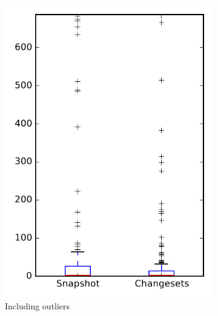 
\begin{figure}
    \centering
    \begin{subfigure}{.4\textwidth}
        \centering
        \includegraphics[height=0.4\textheight]{figures/flt/rq1_bookkeeper}
        \caption{Including outliers}\label{fig:flt:rq1:bookkeeper_outlier}
    \end{subfigure}%
    \begin{subfigure}{.4\textwidth}
        \centering

\end{subfigure}
\end{figure}
